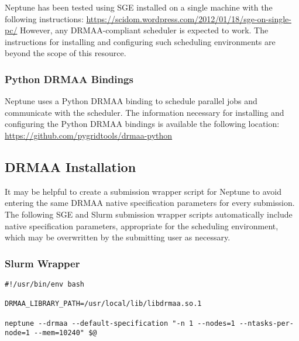 \documentclass[a4paper,10pt]{article}
\begin{document}
Neptune has been tested using SGE installed on a single machine with the following instructions:
\newline\newline
\url{https://scidom.wordpress.com/2012/01/18/sge-on-single-pc/}
\newline\newline
However, any DRMAA-compliant scheduler is expected to work. The instructions for installing and configuring such scheduling environments are beyond the scope of this resource.

\subsubsection{Python DRMAA Bindings}

Neptune uses a Python DRMAA binding to schedule parallel jobs and communicate with the scheduler. The information necessary for installing and configuring the Python DRMAA bindings is available the following location:
\newline\newline
\url{https://github.com/pygridtools/drmaa-python}

\subsection{DRMAA Installation}

It may be helpful to create a submission wrapper script for Neptune to avoid entering the same DRMAA native specification parameters for every submission. The following SGE and Slurm submission wrapper scripts automatically include native specification parameters, appropriate for the scheduling environment, which may be overwritten by the submitting user as necessary.

\subsubsection{Slurm Wrapper}

\begin{minipage}{\linewidth}
\begin{lstlisting}[frame=single, style=bash, title={neptune-slurm}]
#!/usr/bin/env bash

DRMAA_LIBRARY_PATH=/usr/local/lib/libdrmaa.so.1

neptune --drmaa --default-specification "-n 1 --nodes=1 --ntasks-per-node=1 --mem=10240" $@
\end{lstlisting}
\end{minipage}
\end{document}

